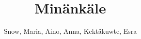 \documentclass[justified,oneside,notoc]{tufte-book}
\title{Min\"ank\"ale}
\author{Snow, Maria, Aino, Anna, Kekt\"akuwte, Esra}
\begin{document}
\maketitle

\tableofcontents



%
%
%
%
%
%
%
%
%
%
%
%
\nobibliography{}
\end{document}
